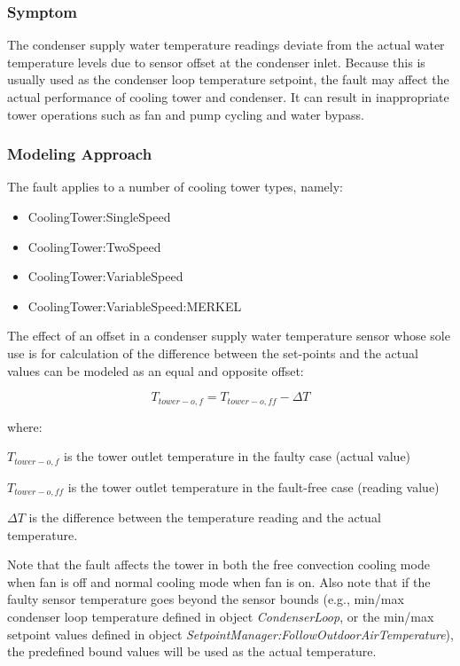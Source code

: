 \subsubsection{Symptom}

The condenser supply water temperature readings deviate from the actual water temperature levels due to sensor offset at the condenser inlet. Because this is usually used as the condenser loop temperature setpoint, the fault may affect the actual performance of cooling tower and condenser. It can result in inappropriate tower operations such as fan and pump cycling and water bypass. 

\subsubsection{Modeling Approach}

The fault applies to a number of cooling tower types, namely:

\begin{itemize}
\tightlist
\item
  CoolingTower:SingleSpeed
\item
  CoolingTower:TwoSpeed
\item
  CoolingTower:VariableSpeed
\item
  CoolingTower:VariableSpeed:MERKEL
\end{itemize}

The effect of an offset in a condenser supply water temperature sensor whose sole use is for calculation of the difference between the set-points and the actual values can be modeled as an equal and opposite offset: 

\begin{equation}
T_{tower-o,f} = T_{tower-o,ff} - \Delta T
\end{equation}

where:

\(T_{tower-o,f}\) is the tower outlet temperature in the faulty case (actual value)

\(T_{tower-o,ff}\) is the tower outlet temperature in the fault-free case (reading value)

\(\Delta T\) is the difference between the temperature reading and the actual temperature.

Note that the fault affects the tower in both the free convection cooling mode when fan is off and normal cooling mode when fan is on. Also note that if the faulty sensor temperature goes beyond the sensor bounds (e.g., min/max condenser loop temperature defined in object \emph{CondenserLoop}, or the min/max setpoint values defined in object \emph{SetpointManager:FollowOutdoorAirTemperature}), the predefined bound values will be used as the actual temperature.


